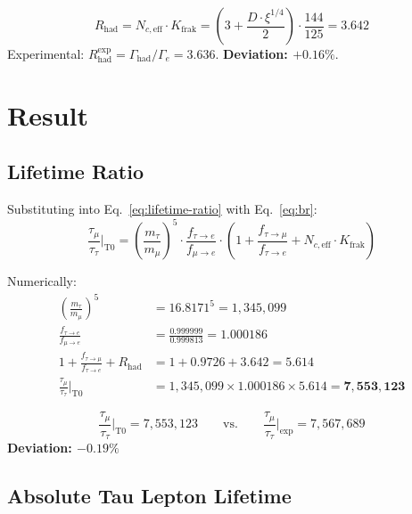 	\begin{keypoint}
		\begin{equation}
			R_\text{had} = N_{c,\text{eff}} \cdot K_\text{frak} = \left(3 + \frac{D \cdot \xi^{1/4}}{2}\right) \cdot \frac{144}{125} = 3.642
			\label{eq:rhad}
		\end{equation}
		Experimental: $R_\text{had}^\text{exp} = \Gamma_\text{had}/\Gamma_e = 3.636$. \textbf{Deviation: $+0.16\%$}.
	\end{keypoint}
	
	
	\section{Result}
	
	\subsection{Lifetime Ratio}
	
	Substituting into Eq.~\eqref{eq:lifetime-ratio} with Eq.~\eqref{eq:br}:
	\begin{equation}
		\frac{\tau_\mu}{\tau_\tau}\bigg|_\text{T0} = \left(\frac{m_\tau}{m_\mu}\right)^5 \cdot \frac{f_{\tau \to e}}{f_{\mu \to e}} \cdot \left(1 + \frac{f_{\tau \to \mu}}{f_{\tau \to e}} + N_{c,\text{eff}} \cdot K_\text{frak}\right)
	\end{equation}
	
	Numerically:
	\begin{align}
		\left(\frac{m_\tau}{m_\mu}\right)^5 &= 16.8171^5 = 1{,}345{,}099 \\
		\frac{f_{\tau \to e}}{f_{\mu \to e}} &= \frac{0.999999}{0.999813} = 1.000186 \\
		1 + \frac{f_{\tau \to \mu}}{f_{\tau \to e}} + R_\text{had} &= 1 + 0.9726 + 3.642 = 5.614 \\[6pt]
		\frac{\tau_\mu}{\tau_\tau}\bigg|_\text{T0} &= 1{,}345{,}099 \times 1.000186 \times 5.614 = \mathbf{7{,}553{,}123}
	\end{align}
	
	\begin{keypoint}
		\begin{equation}
			\frac{\tau_\mu}{\tau_\tau}\bigg|_\text{T0} = 7{,}553{,}123 \qquad \text{vs.} \qquad \frac{\tau_\mu}{\tau_\tau}\bigg|_\text{exp} = 7{,}567{,}689
		\end{equation}
		\textbf{Deviation: $-0.19\%$}
	\end{keypoint}
	
	\subsection{Absolute Tau Lepton Lifetime}
	
